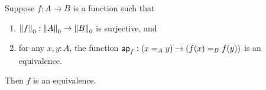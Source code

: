 \documentclass[hott-all.tex]{subfiles}
\begin{document}
% 
% 
% 
\begin{thm}
  Suppose $f:A\to B$ is a function such that
  \begin{enumerate}
  \item $\trunc0 f : \trunc0 A \to \trunc0 B$ is surjective, and
  \item for any $x,y:A$, the function $\apfunc f : (\id[A]xy) \to (\id[B]{f(x)}{f(y)})$ is an equivalence.
  \end{enumerate}
  Then $f$ is an equivalence.
\end{thm}
\end{document}
